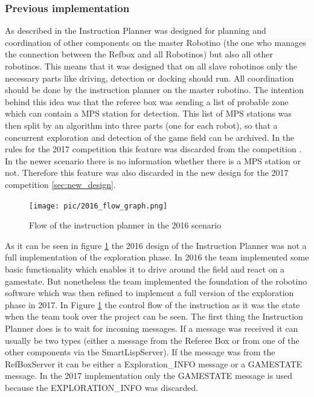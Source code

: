 \subsubsection{Previous implementation}
\label{sec:previous}

As described in \cite{BOK} the Instruction Planner was designed for planning and coordination of other components on the master Robotino (the one who manages the connection between the Refbox and all Robotinos) but also all other robotinos. This means that it was designed that on all slave robotinos only the necessary parts like driving, detection or docking should run. All coordination should be done by the instruction planner on the master robotino. The intention behind this idea was that the referee box was sending a list of probable zone which can contain a MPS station for detection. This list of MPS stations was then split by an algorithm into three parts (one for each robot), so that a concurrent exploration and detection of the game field can be archived. In the rules for the 2017 competition this feature was discarded from the competition \cite{RCLL2017}. In the newer scenario there is no information whether there is a MPS station or not. Therefore this feature was also discarded in the new design for the 2017 competition \ref{sec:new_design}.  \\



\begin{figure}[h]
\centering
\texttt{[image: pic/2016\_flow\_graph.png]}
\caption{Flow of the instruction planner in the 2016 scenario}
\label{fig:ip2016}

\end{figure}


As it can be seen in figure \ref{fig:ip2016} the 2016 design of the Instruction Planner was not a full implementation of the exploration phase. In 2016 the team implemented some basic functionality which enables it to drive around the field and react on a gamestate. But nonetheless the team implemented the foundation of the robotino software which was then refined to implement a full version of the exploration phase in 2017. In Figure \ref{fig:ip2016} the control flow of the instruction as it was the state when the team took over the project can be seen. The first thing the Instruction Planner does is to wait for incoming messages. If a message was received it can usually be two types (either a message from the Referee Box or from one of the other components via the SmartLispServer). If the message was from the RefBoxServer it can be either a Exploration\_INFO message or a GAMESTATE message. In the 2017 implementation only the GAMESTATE message is used because the EXPLORATION\_INFO was discarded. \\

